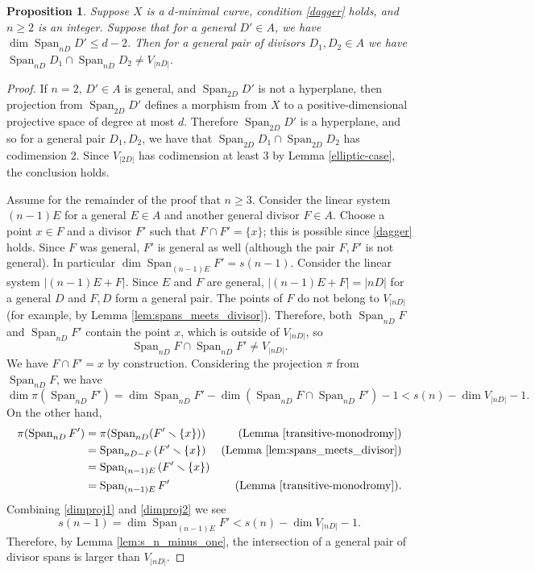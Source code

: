 \documentclass[11pt]{amsart}
\newcommand{\Span}{\operatorname{Span}}
\newtheorem{proposition}[theorem]{Proposition}
\theoremstyle{definition}
\theoremstyle{remark}
\begin{document}
\begin{proposition}\label{extra-intersections}
Suppose $X$ is a $d$-minimal curve, condition \eqref{dagger} holds, and $n \geqslant 2$ is an integer. 
Suppose that for a general $D' \in A$,  we have $\dim \Span_{nD}D' \leqslant d-2$. Then for a general pair of divisors $D_1, D_2 \in A$ we have $\Span_{nD} D_1 \cap \Span_{nD} D_2 \neq V_{|nD|}.$
\end{proposition}
\begin{proof}
    If $n=2$, $D' \in A$ is general, and $\Span_{2D} D'$ is not a hyperplane, then projection from $\Span_{2D} D'$ defines a morphism from $X$ to a positive-dimensional projective space of degree at most $d$. Therefore $\Span_{2D} D'$ is a hyperplane, and so for a general pair $D_1, D_2$, we have that $\Span_{2D} D_1 \cap \Span_{2D} D_2$ has codimension $2$.  Since \(V_{|2D|}\) has codimension at least \(3\) by Lemma \ref{elliptic-case}, the conclusion holds.
        
 Assume for the remainder of the proof that $n \geqslant 3$.
    Consider the linear system $(n-1)E$ for a general $E \in A$ and another general divisor $F \in A$. Choose a point $x \in F$ and a divisor $F'$ such that $F \cap F'=\{x\}$; this is possible since \eqref{dagger} holds. Since $F$ was general, $F'$ is general as well (although the pair \(F, F'\) is not general). In particular $\dim\Span_{(n-1)E}F'=s(n-1)$. Consider the linear system $|(n-1)E+F|$. Since $E$ and $F$ are general, $|(n-1)E+F|=|nD|$ for a general $D$ and $F, D$ form a general pair.  The points of $F$ do not belong to $V_{|nD|}$ (for example, by Lemma \ref{lem:spans_meets_divisor}). Therefore, both $\Span_{nD}F$ and $\Span_{nD}F'$ contain the point $x$, which is outside of $V_{|nD|}$, so
    \[\Span_{nD}F \cap \Span_{nD}F' \neq V_{|nD|}.\]
    We have $F \cap F'=x$ by construction.  Considering the projection \(\pi\) from \(\Span_{nD} F\), we have
    \begin{equation}\label{dimproj1}\dim \pi(\Span_{nD} F') = \dim \Span_{nD} F' - \dim(\Span_{nD}F \cap \Span_{nD}F') - 1 < s(n) - \dim V_{|nD|} - 1. \end{equation}
    On the other hand, 
 \begin{align}\label{dimproj2}
 \pi(\Span_{nD} F') &=  \pi(\Span_{nD} (F' \smallsetminus \{x\})) & (\text{Lemma  \ref{transitive-monodromy}})\\
 &=  \Span_{nD-F} \left( F' \smallsetminus \{x\}\right) &  \text{(Lemma \ref{lem:spans_meets_divisor})} \notag \\
 &= \Span_{(n-1)E} \left(F' \smallsetminus \{x\} \right) \notag \\
 &= \Span_{(n-1)E} F'  & (\text{Lemma  \ref{transitive-monodromy}}).\notag
 \end{align}
    Combining \eqref{dimproj1} and \eqref{dimproj2} we see
    \[s(n-1) = \dim \Span_{(n-1)E} F' <  s(n) - \dim V_{|nD|} - 1.\]
    Therefore, by Lemma \ref{lem:s_n_minus_one}, the intersection of a general pair of divisor spans is larger than \(V_{|nD|}\).
\end{proof}
\end{document}

